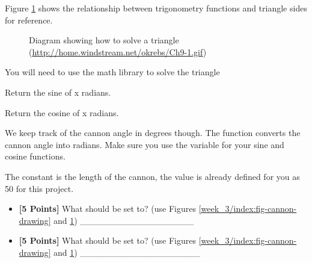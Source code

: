 \documentclass[letterpaper,10pt,english]{sphinxmanual}
\begin{document}
Figure \ref{week_3/index:fig-right-triangle} shows the relationship between trigonometry functions and triangle sides for reference.
\begin{figure}[htbp]
\centering
\capstart

\caption{Diagram showing how to solve a triangle (\href{http://home.windstream.net/okrebs/Ch9-1.gif}{http://home.windstream.net/okrebs/Ch9-1.gif})}\label{week_3/index:fig-right-triangle}\end{figure}

You will need to use the math library to solve the triangle

\begin{fulllineitems}
\label{week_3/index:math.sin}
Return the sine of x radians.

\end{fulllineitems}


\begin{fulllineitems}
\label{week_3/index:math.cos}
Return the cosine of x radians.

\end{fulllineitems}


We keep track of the cannon angle in degrees though. The  function converts the cannon angle into radians. Make sure you use the  variable for your sine and cosine functions.

The  constant is the length of the cannon, the value is already defined for you as 50 for this project.
\begin{itemize}
\item {} 
\textbf{{[}5 Points{]}} What should  be set to? (use Figures \ref{week_3/index:fig-cannon-drawing} and \ref{week_3/index:fig-right-triangle})  \_\_\_\_\_\_\_\_\_\_\_\_\_\_\_\_\_\_

\item {} 
\textbf{{[}5 Points{]}} What should  be set to? (use Figures \ref{week_3/index:fig-cannon-drawing} and \ref{week_3/index:fig-right-triangle})  \_\_\_\_\_\_\_\_\_\_\_\_\_\_\_\_\_\_\_

\end{itemize}
\end{document}
